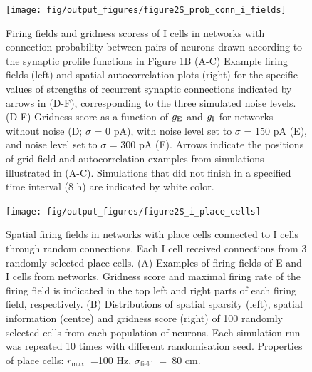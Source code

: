 \documentclass[a4paper,12pt]{article}
\newcommand{\ssc}[3]{\ensuremath{#1_{\text{#2}_{\text{#3}}}}}
\newcommand{\gE      }{\ssc{g}      {\scriptsize{E}}{}}
\newcommand{\gI      }{\ssc{g}      {\scriptsize{I}}{}}
\begin{document}
\clearpage

\begin{figure}[p]
    \internallinenumbers
    \centering
        \texttt{[image: fig/output\_figures/figure2S\_prob\_conn\_i\_fields]}
    \caption{Firing fields and gridness scoress of I cells in networks with
    connection probability between pairs of neurons drawn according to the
    synaptic profile functions in Figure 1B (A-C) Example firing fields (left)
    and spatial autocorrelation plots (right) for the specific values of
    strengths of recurrent synaptic connections indicated by arrows in (D-F),
    corresponding to the three simulated noise levels.  (D-F) Gridness score as
    a function of $\gE$ and $\gI$ for networks without noise (D; $\sigma$ = 0
    pA), with noise level set to $\sigma$ = 150 pA (E), and noise level set to
    $\sigma$ = 300 pA (F). Arrows indicate the positions of grid field and
    autocorrelation examples from simulations illustrated in (A-C). Simulations
    that did not finish in a specified time interval (8 h) are indicated by
    white color.}
\end{figure}

\clearpage

\begin{figure}[p]
    \internallinenumbers
    \centering
        \texttt{[image: fig/output\_figures/figure2S\_i\_place\_cells]}
    \caption{Spatial firing fields in networks with place cells connected to I
    cells through random connections. Each I cell received connections from 3
    randomly selected place cells. (A) Examples of firing fields of E and I
    cells from networks. Gridness score and maximal firing rate of the firing
    field is indicated in the top left and right parts of each firing field,
    respectively. (B) Distributions of spatial sparsity (left), spatial
    information (centre) and gridness score (right) of 100 randomly selected
    cells from each population of neurons. Each simulation run was repeated 10
    times with different randomisation seed. Properties of place cells:
    \ssc{r}{max}{}~=100 Hz, \ssc{\sigma}{field}{}~=~80 cm.}
    \label{fig:ipc}
\end{figure}

\clearpage

%
\end{document}
